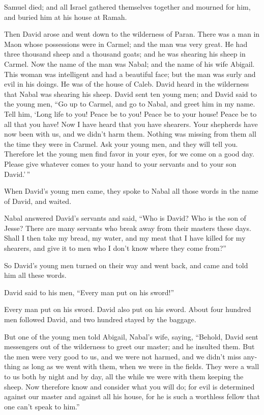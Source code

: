 \begin{paracol}{2}
\begin{otherlanguage}{english}
 Samuel died; and all Israel gathered themselves together
and mourned for him, and buried him at his house at Ramah.

Then David arose and went down to the wilderness of Paran.
 There was a man in Maon whose possessions were in Carmel;
and the man was very great. He had three thousand sheep and a thousand
goats; and he was shearing his sheep in Carmel.  Now the
name of the man was Nabal; and the name of his wife Abigail. This woman
was intelligent and had a beautiful face; but the man was surly and evil
in his doings. He was of the house of Caleb.  David heard
in the wilderness that Nabal was shearing his sheep. 
David sent ten young men; and David said to the young men, ``Go up to
Carmel, and go to Nabal, and greet him in my name.  Tell
him, `Long life to you! Peace be to you! Peace be to your house! Peace
be to all that you have!  Now I have heard that you have
shearers. Your shepherds have now been with us, and we didn't harm them.
Nothing was missing from them all the time they were in Carmel.
 Ask your young men, and they will tell you. Therefore let
the young men find favor in your eyes, for we come on a good day. Please
give whatever comes to your hand to your servants and to your son
David.'\,''

 When David's young men came, they spoke to Nabal all
those words in the name of David, and waited.

 Nabal answered David's servants and said, ``Who is
David? Who is the son of Jesse? There are many servants who break away
from their masters these days.  Shall I then take my
bread, my water, and my meat that I have killed for my shearers, and
give it to men who I don't know where they come from?''

 So David's young men turned on their way and went back,
and came and told him all these words.

 David said to his men, ``Every man put on his sword!''

Every man put on his sword. David also put on his sword. About four
hundred men followed David, and two hundred stayed by the baggage.

 But one of the young men told Abigail, Nabal's wife,
saying, ``Behold, David sent messengers out of the wilderness to greet
our master; and he insulted them.  But the men were very
good to us, and we were not harmed, and we didn't miss anything as long
as we went with them, when we were in the fields.  They
were a wall to us both by night and by day, all the while we were with
them keeping the sheep.  Now therefore know and consider
what you will do; for evil is determined against our master and against
all his house, for he is such a worthless fellow that one can't speak to
him.''


\end{otherlanguage}
\end{paracol}
